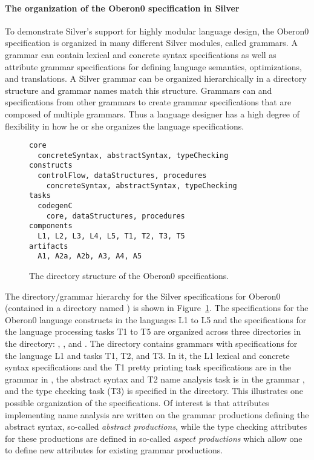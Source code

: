 \paragraph{The organization of the Oberon0 specification in Silver}

To demonstrate Silver's support for highly modular language design, the
Oberon0 specification is organized in many different Silver modules,
called grammars.
%
A grammar can contain lexical and concrete syntax specifications as
well as attribute grammar specifications for defining language
semantics, optimizations, and translations.  
%
A Silver grammar can be organized hierarchically in a directory
structure and grammar names match this structure.  
%
%
Grammars can  and  specifications from other grammars to
create grammar specifications that are composed of multiple grammars. 
%
Thus a language designer has a high degree of flexibility in how he or
she organizes the language specifications.

\begin{figure}
\begin{verbatim}
core
  concreteSyntax, abstractSyntax, typeChecking
constructs
  controlFlow, dataStructures, procedures  
    concreteSyntax, abstractSyntax, typeChecking
tasks
  codegenC
    core, dataStructures, procedures
components
  L1, L2, L3, L4, L5, T1, T2, T3, T5
artifacts
  A1, A2a, A2b, A3, A4, A5
\end{verbatim}
\caption{The directory structure of the Oberon0 specifications.}
\label{silver:fig:structure}
\end{figure}

The directory/grammar hierarchy for the Silver specifications for
Oberon0 (contained in a directory named ) is shown in
Figure~\ref{silver:fig:structure}.  The specifications for the Oberon0
language constructs in the languages L1 to L5 and the specifications
for the language processing tasks T1 to T5 are organized across three
directories in the  directory: ,
, and .
%
The  directory contains grammars with specifications for
the language L1 and tasks T1, T2, and T3.
%
In it, the L1 lexical and concrete syntax specifications and the T1 pretty
printing task specifications are in the grammar in
, the abstract syntax and T2 name analysis task
is in the grammar , and the type checking task
(T3) is specified in the  directory.
%
This illustrates one possible organization of the specifications.  Of
interest is that attributes implementing name analysis are written
on the grammar productions defining the abstract syntax, so-called
\emph{abstract productions}, while the type
checking attributes for these productions are defined in so-called
\emph{aspect productions} which allow one to define new attributes for
existing grammar productions.

